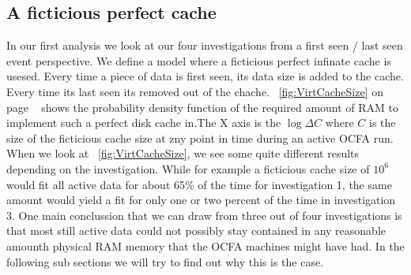 \subsection{A ficticious perfect cache}
In our first analysis we look at our four investigations from a first seen / last seen event perspective. We define a model where a ficticious perfect infinate cache is usesed. Every time a piece of data is first seen, its data size is added to the cache. Every time its last seen its removed out of the chache. ~\ref{fig:VirtCacheSize} on page ~\pageref{fig:VirtCacheSize} shows the probability density function of the required amount of RAM to implement such a perfect disk cache in.The X axis is the $\log{\Delta C}$ where $C$ is the size of the ficticious cache size at zny point in time during an active OCFA run. When we look at ~\ref{fig:VirtCacheSize}, we see some quite different results depending on the investigation. While for example a ficticious cache size of $10^6$ would fit all active data for about 65\% of the time for investigation 1, the same amount would yield a fit for only one or two percent of the time in investigation 3. One main conclussion that we can draw from three out of four investigations is that most still active data could not possibly stay contained in any reasonable amounth physical RAM memory that the OCFA machines might have had. In the following sub sections we will try to find out why this is the case.
